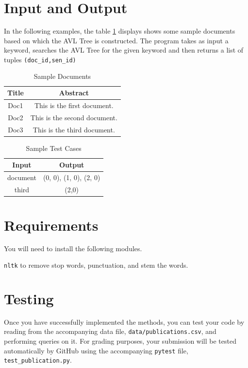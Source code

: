 \documentclass[addpoints]{exam}
\begin{document}
\section*{Input and Output}
In the following examples, the table \ref{tab:inp} displays shows some sample documents based on which the AVL Tree is constructed. The program takes as input a keyword, searches the AVL Tree for the given keyword and then returns a list of tuples \texttt{(doc\_id,sen\_id)}
\begin{table}[h!]
  \centering
  \begin{tabular}{|c|c|}
    \hline
    Title & Abstract \\ \hline
    Doc1 & This is the first document. \\ \hline
    Doc2 & This is the second document.\\ \hline
    Doc3 & This is the third document. \\ \hline
  \end{tabular}
  \caption{Sample Documents}
  \label{tab:inp}
\end{table}
\newpage
\begin{table}[h!]
  \centering
  \begin{tabular}{|c|c|}
    \hline
    Input & Output \\ \hline
    document &  (0, 0), (1, 0), (2, 0) \\ \hline
    third & (2,0) \\ \hline
  \end{tabular}
  \caption{Sample Test Cases}
  \label{tab:test}
\end{table}

\section*{Requirements}

You will need to install the following modules.
\item [\texttt{nltk}]  to remove stop words, punctuation, and stem the words.



\section*{Testing}
Once you have successfully implemented the methods, you can test your code by reading from the accompanying data file, \texttt{data/publications.csv}, and performing queries on it. For grading purposes, your submission will
be tested automatically by GitHub using the accompanying \texttt{pytest} file, \texttt{test\_publication.py}.
\end{document}
